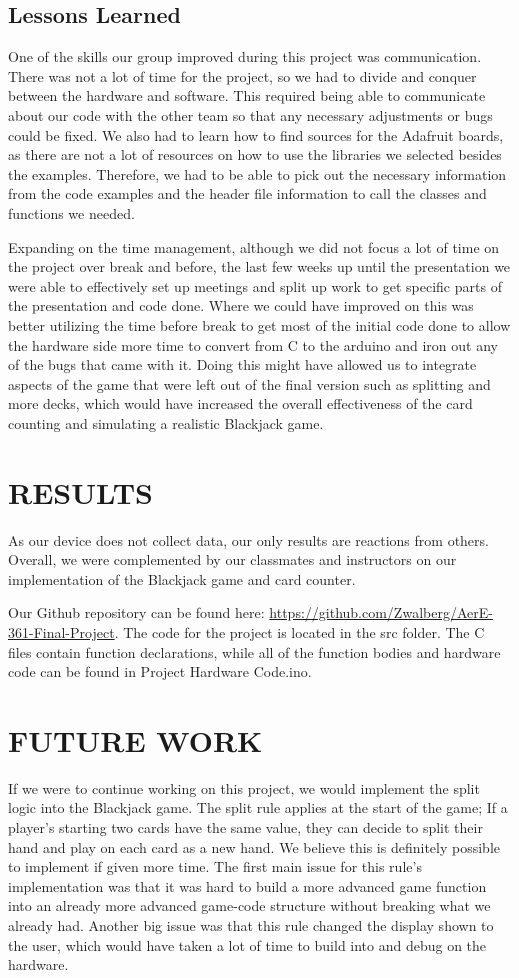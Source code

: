 \documentclass[12pt]{article}
\begin{document}
\subsection{Lessons Learned}
One of the skills our group improved during this project was communication. There was not a lot of time for the project, so we had to divide and conquer between the hardware and software. This required being able to communicate about our code with the other team so that any necessary adjustments or bugs could be fixed. We also had to learn how to find sources for the Adafruit boards, as there are not a lot of resources on how to use the libraries we selected besides the examples. Therefore, we had to be able to pick out the necessary information from the code examples and the header file information to call the classes and functions we needed.

Expanding on the time management, although we did not focus a lot of time on the project over break and before, the last few weeks up until the presentation we were able to effectively set up meetings and split up work to get specific parts of the presentation and code done. Where we could have improved on this was better utilizing the time before break to get most of the initial code done to allow the hardware side more time to convert from C to the arduino and iron out any of the bugs that came with it. Doing this might have allowed us to integrate aspects of the game that were left out of the final version such as splitting and more decks, which would have increased the overall effectiveness of the card counting and simulating a realistic Blackjack game. 

\section{RESULTS}
As our device does not collect data, our only results are reactions from others. Overall, we were complemented by our classmates and instructors on our implementation of the Blackjack game and card counter.

Our Github repository can be found here: \url{https://github.com/Zwalberg/AerE-361-Final-Project}. The code for the project is located in the src folder. The C files contain function declarations, while all of the function bodies and hardware code can be found in Project Hardware Code.ino.

\section{FUTURE WORK}
If we were to continue working on this project, we would implement the split logic into the Blackjack game. The split rule applies at the start of the game; If a player’s starting two cards have the same value, they can decide to split their hand and play on each card as a new hand. We believe this is definitely possible to implement if given more time. The first main issue for this rule’s implementation was that it was hard to build a more advanced game function into an already more advanced game-code structure without breaking what we already had. Another big issue was that this rule changed the display shown to the user, which would have taken a lot of time to build into and debug on the hardware.
\end{document}
